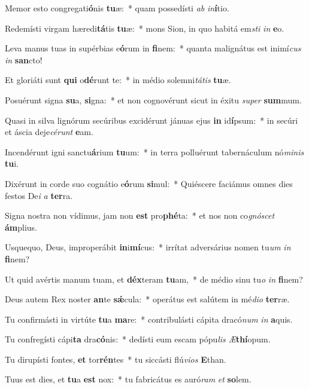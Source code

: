 \item Memor esto congregati\textbf{ó}nis \textbf{tu}æ:~* quam possedísti \textit{ab} \textit{in}\textbf{í}tio.
\item Redemísti virgam hæredi\textbf{tá}tis \textbf{tu}æ:~* mons Sion, in quo habitá em\textit{sti} \textit{in} \textbf{e}o.
\item Leva manus tuas in supérbias e\textbf{ó}rum in \textbf{fi}nem:~* quanta malignátus est inimí\textit{cus} \textit{in} \textbf{san}cto!
\item Et gloriáti sunt \textbf{qui} o\textbf{dé}runt te:~* in médio solemni\textit{tátis} \textbf{tu}æ.
\item Posuérunt signa \textbf{su}a, \textbf{si}gna:~* et non cognovérunt sicut in éxitu \textit{super} \textbf{sum}mum.
\item Quasi in silva lignórum secúribus excidérunt jánuas ejus \textbf{in} id\textbf{í}psum:~* in secúri et áscia deje\textit{cérunt} \textbf{e}am.
\item Incendérunt igni sanctu\textbf{á}rium \textbf{tu}um:~* in terra polluérunt tabernáculum nó\textit{minis} \textbf{tu}i.
\item Dixérunt in corde suo cognátio e\textbf{ó}rum \textbf{si}mul:~* Quiéscere faciámus omnes dies festos De\textit{i} \textit{a} \textbf{ter}ra.
\item Signa nostra non vídimus, jam non \textbf{est} pro\textbf{phé}ta:~* et nos non co\textit{gnóscet} \textbf{ám}plius.
\item Usquequo, Deus, improperábit \textbf{in}i\textbf{mí}cus:~* irrítat adversárius nomen tu\textit{um} \textit{in} \textbf{fi}nem?
\item Ut quid avértis manum tuam, et \textbf{déx}teram \textbf{tu}am,~* de médio sinu tu\textit{o} \textit{in} \textbf{fi}nem?
\item Deus autem Rex noster \textbf{an}te \textbf{sǽ}cula:~* operátus est salútem in mé\textit{dio} \textbf{ter}ræ.
\item Tu confirmásti in virtúte \textbf{tu}a \textbf{ma}re:~* contribulásti cápita dracó\textit{num} \textit{in} \textbf{a}quis.
\item Tu confregísti cápi\textbf{ta} dra\textbf{có}nis:~* dedísti eum escam pópu\textit{lis} \textit{Æ}\textbf{thí}opum.
\item Tu dirupísti fontes, \textbf{et} tor\textbf{rén}tes~* tu siccásti flú\textit{vios} \textbf{E}than.
\item Tuus est dies, et \textbf{tu}a \textbf{est} nox:~* tu fabricátus es auró\textit{ram} \textit{et} \textbf{so}lem.
